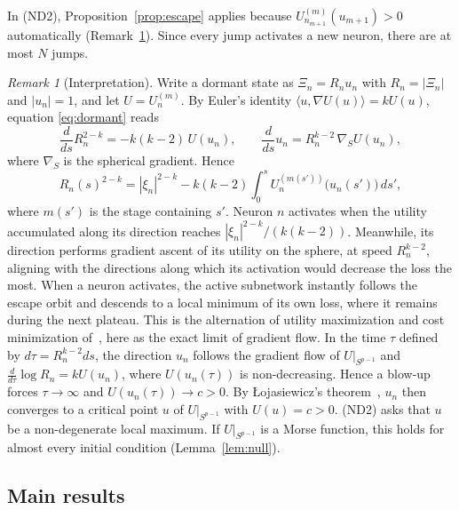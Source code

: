\documentclass[11pt]{article}
\theoremstyle{definition}
\theoremstyle{remark}
\newtheorem{remark}[theorem]{Remark}
\numberwithin{equation}{section}
\newcommand{\ip}[2]{\langle #1,#2\rangle}
\newcommand{\ND}[1]{\textup{(ND#1)}}
\begin{document}
In \ND2, Proposition~\ref{prop:escape} applies because $U^{(m)}_{n_{m+1}}(u_{m+1})>0$ automatically (Remark~\ref{rem:interpretation}). Since every jump activates a new neuron, there are at most $N$ jumps.

\begin{remark}[Interpretation]\label{rem:interpretation}
Write a dormant state as $\Xi_n=R_nu_n$ with $R_n=|\Xi_n|$ and $|u_n|=1$, and let $U=U^{(m)}_n$. By Euler's identity $\ip{u}{\nabla U(u)}=kU(u)$, equation \eqref{eq:dormant} reads
\[
\frac{d}{ds}R_n^{2-k}=-k(k-2)\,U(u_n),\qquad \frac{d}{ds}u_n=R_n^{k-2}\,\nabla_{S}U(u_n),
\]
where $\nabla_S$ is the spherical gradient. Hence
\[
R_n(s)^{2-k}=|\xi_n|^{2-k}-k(k-2)\int_0^sU_n^{(m(s'))}\big(u_n(s')\big)\,ds',
\]
where $m(s')$ is the stage containing $s'$. Neuron $n$ activates when the utility accumulated along its direction reaches $|\xi_n|^{2-k}/(k(k-2))$. Meanwhile, its direction performs gradient ascent of its utility on the sphere, at speed $R_n^{k-2}$, aligning with the directions along which its activation would decrease the loss the most. When a neuron activates, the active subnetwork instantly follows the escape orbit and descends to a local minimum of its own loss, where it remains during the next plateau. This is the alternation of utility maximization and cost minimization of~\cite{KMC25}, here as the exact limit of gradient flow. In the time $\tau$ defined by $d\tau=R_n^{k-2}ds$, the direction $u_n$ follows the gradient flow of $U|_{S^{p-1}}$ and $\frac{d}{d\tau}\log R_n=kU(u_n)$, where $U(u_n(\tau))$ is non-decreasing. Hence a blow-up forces $\tau\to\infty$ and $U(u_n(\tau))\to c>0$. By {\L}ojasiewicz's theorem~\cite{Loj84}, $u_n$ then converges to a critical point $u$ of $U|_{S^{p-1}}$ with $U(u)=c>0$. \ND2 asks that $u$ be a non-degenerate local maximum. If $U|_{S^{p-1}}$ is a Morse function, this holds for almost every initial condition (Lemma~\ref{lem:null}).
\end{remark}

\subsection{Main results}
\end{document}
